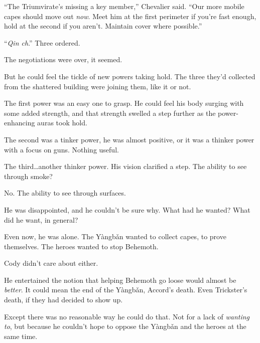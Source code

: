 ``The Triumvirate's missing a key member,'' Chevalier said.  ``Our more mobile capes should move out \emph{now}.  Meet him at the first perimeter if you're fast enough, hold at the second if you aren't.  Maintain cover where possible.''



``\emph{Qin ch}.''  Three ordered.



The negotiations were over, it seemed.



But he could feel the tickle of new powers taking hold.  The three they'd collected from the shattered building were joining them, like it or not.



The first power was an easy one to grasp.  He could feel his body surging with some added strength, and that strength swelled a step further as the power-enhancing auras took hold.



The second was a tinker power, he was almost positive, or it was a thinker power with a focus on guns.  Nothing useful.



The third\ldots another thinker power.  His vision clarified a step.  The ability to see through smoke?



No.  The ability to see through surfaces.



He was disappointed, and he couldn't be sure why.  What had he wanted?  What did he want, in general?



Even now, he was alone.  The Y\`{a}ngb\v{a}n wanted to collect capes, to prove themselves.  The heroes wanted to stop Behemoth.



Cody didn't care about either.



He entertained the notion that helping Behemoth go loose would almost be \emph{better}.  It could mean the end of the Y\`{a}ngb\v{a}n, Accord's death.  Even Trickster's death, if they had decided to show up.



Except there was no reasonable way he could do that.  Not for a lack of \emph{wanting to}, but because he couldn't hope to oppose the Y\`{a}ngb\v{a}n and the heroes at the same time.



